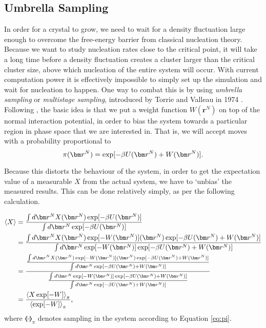 \documentclass[thesis]{subfiles}
\begin{document}
\subsection{Umbrella Sampling}\label{subsec:US}

In order for a crystal to grow, we need to wait for a density fluctuation large enough to overcome the free-energy barrier from classical nucleation theory. Because we want to study nucleation rates close to the critical point, it will take a long time before a density fluctuation creates a cluster larger than the critical cluster size, above which nucleation of the entire system will occur.  With current computation power it is effectively impossible to simply set up the simulation and wait for nucleation to happen. One way to combat this is by using \emph{umbrella sampling} or \emph{multistage sampling}, introduced by Torrie and Valleau in 1974 \cite{torrie1974monte}.\\

Following \cite{allen2004introduction}, the basic idea is that we put a weight function $W(\bm r^N)$ on top of the normal interaction potential, in order to bias the system towards a particular region in phase space that we are interested in. That is, we will accept moves with a probability proportional to
\begin{equation}
\pi\argr = \exp [-\beta U\argr + W\argr].
\end{equation}\label{eq:pi}

Because this distorts the behaviour of the system, in order to get the expectation value of a measurable $X$ from the actual system, we have to `unbias' the measured results. This can be done relatively simply, as per the following calculation.

\begin{align}
	\llangle X \rrangle &= \frac{
		\int d\bm r^N X\argr \exp[-\beta U\argr]
	}{
		\int d\bm r^N \exp[-\beta U\argr]
	}\\
	&= \frac{
		\int d\bm r^N X\argr \exp[-W\argr] \argr \exp[-\beta U\argr + W\argr]
	}{
		\int d\bm r^N \exp[-W\argr] \exp[-\beta U\argr + W\argr]
	}\\
	&= \frac{
		\frac{
			\int d\bm r^N X\argr \exp[-W\argr] \argr \exp[-\beta U\argr + W\argr]
		}{
			\int d\bm r^N \exp[-\beta U\argr + W\argr]
		}
	}{
		\frac{
			\int d\bm r^N \exp[-W\argr] \exp[-\beta U\argr + W\argr]
		}{
			\int d\bm r^N \exp[-\beta U\argr + W\argr]
		}
	}\\
	&= \frac{
		\llangle X \exp[-W] \rrangle_\pi
	}{
		\llangle \exp[-W] \rrangle_\pi
	},
\end{align}
where $\llangle \cdot \rrangle_\pi$ denotes sampling in the system according to Equation \ref{eq:pi}. 
\end{document}

